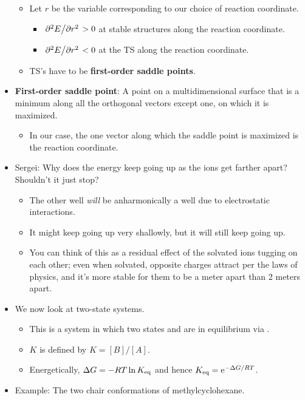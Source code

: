 \documentclass[../notes.tex]{subfiles}
\begin{document}
\begin{itemize}
\begin{itemize}
        \item Let $r$ be the variable corresponding to our choice of reaction coordinate.
        \begin{itemize}
            \item $\pdv*[2]{E}{r}>0$ at stable structures along the reaction coordinate.
            \item $\pdv*[2]{E}{r}<0$ at the TS along the reaction coordinate.
        \end{itemize}
        \item TS's have to be \textbf{first-order saddle points}.
    \end{itemize}
    \item \textbf{First-order saddle point}: A point on a multidimensional surface that is a minimum along all the orthogonal vectors except one, on which it is maximized.
    \begin{itemize}
        \item In our case, the one vector along which the saddle point is maximized is the reaction coordinate.
    \end{itemize}
    \item Sergei: Why does the energy keep going up as the ions get farther apart? Shouldn't it just stop?
    \begin{itemize}
        \item The other well \emph{will} be anharmonically a well due to electrostatic interactions.
        \item It might keep going up very shallowly, but it will still keep going up.
        \item You can think of this as a residual effect of the solvated ions tugging on each other; even when solvated, opposite charges attract per the laws of physics, and it's more stable for them to be a meter apart than 2 meters apart.
    \end{itemize}
    \pagebreak
    \item We now look at two-state systems.
    \begin{itemize}
        \item This is a system in which two states  and  are in equilibrium via .
        \item $K$ is defined by $K=[B]/[A]$.
        \item Energetically, $\Delta G=-RT\ln\Keq$ and hence $\Keq=\e[-\Delta G/RT]$.
    \end{itemize}
    \item Example: The two chair conformations of methylcyclohexane.

\end{itemize}
\end{document}
